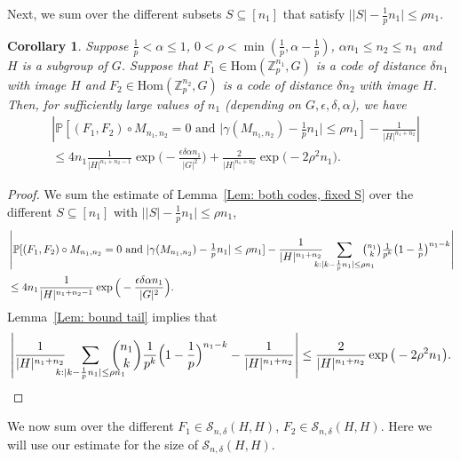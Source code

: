 \documentclass[12pt]{amsart}
\newtheorem{corollary}{Corollary}[theorem]
\theoremstyle{definition}
\newcommand{\PPP}{\mathbb{P}}
\newcommand{\SSS}[3]{\mathcal{S}_{#1}(#2,#3)}
\newcommand{\Mnot}{M_{n_1,n_2}}
\newcommand{\abs}[1]{\vert#1\vert}
\newcommand{\Zp}{\Z_p}
\newcommand{\Z}{\mathbb{Z}}
\newcommand{\Hom}{\text{Hom}}
\begin{document}
Next, we sum over the different subsets $S\subseteq[n_1]$ that satisfy $\abs{\abs{S}-\frac{1}{p}n_1}\leq \rho n_1$.

\begin{corollary}\label{Cor: both codes probability}
Suppose $\frac{1}{p}<\alpha\leq 1$, $0<\rho<\min(\frac{1}{p},\alpha-\frac{1}{p})$, $\alpha n_1\leq n_2\leq n_1$ and $H$ is a subgroup of $G$.
Suppose that $F_1\in\Hom(\Zp^{n_1},G)$ is a code of distance $\delta n_1$ with image $H$ and $F_2\in\Hom(\Zp^{n_2},G)$ is a code of distance $\delta n_2$ with image $H$.
Then, for sufficiently large values of $n_1$ (depending on $G,\epsilon,\delta,\alpha$), we have
\begin{align*}
&\left|
\PPP[(F_1,F_2)\circ \Mnot=0 \text{ and }
\abs{\gamma(\Mnot)- \tfrac{1}{p} n_1}\leq \rho n_1] 
- \frac{1}{\abs{H}^{n_1+n_2}}
\right|\\
&\leq 4n_1\frac{1}{\abs{H}^{n_1+n_2-1}} \exp\Big(-\frac{\epsilon\delta \alpha n_1}{|G|^2}\Big)
+ \frac{2}{\abs{H}^{n_1+n_2}} \exp\big(-2\rho^2 n_1\big).
\end{align*}
\end{corollary}
\begin{proof}
We sum the estimate of Lemma~\ref{Lem: both codes, fixed S} over the different $S\subseteq[n_1]$ with $\abs{\abs{S} - \frac{1}{p}n_1} \leq \rho n_1$,
\begin{align*}
&\left|
\PPP[(F_1,F_2)\circ \Mnot=0 \text{ and }
\abs{\gamma(\Mnot) -\tfrac{1}{p}n_1}\leq \rho n_1] 
- \frac{1}{\abs{H}^{n_1+n_2}}\!\!\!\!\!\!
\sum_{k:\abs{k-\frac{1}{p}n_1}\leq \rho n_1} \!\!\!\!\!\!\!\!
\tbinom{n_1}{k} \tfrac{1}{p^{k}} \big(1-\tfrac{1}{p}\big)^{n_1-k}
\right|\\
&\leq 4n_1\frac{1}{\abs{H}^{n_1+n_2-1}} \exp\Big(-\frac{\epsilon\delta \alpha n_1}{|G|^2}\Big).
\end{align*}
Lemma~\ref{Lem: bound tail} implies that
\[
\left|
\frac{1}{\abs{H}^{n_1+n_2}}\!\!\!\!\!\!
\sum_{k:\abs{k-\frac{1}{p}n_1}\leq \rho n_1} \!\!\!\!\!\!\!\!
\binom{n_1}{k} \frac{1}{p^{k}} \Big(1-\frac{1}{p}\Big)^{n_1-k}
-\frac{1}{\abs{H}^{n_1+n_2}}
\right|
\leq \frac{2}{\abs{H}^{n_1+n_2}} \exp\big(-2\rho^2 n_1\big).\qedhere
\]
\end{proof}

We now sum over the different $F_1\in \SSS{n,\delta}{H}{H}$, $F_2\in \SSS{n,\delta}{H}{H}$. Here we will use our estimate for the size of $\SSS{n,\delta}{H}{H}$.
\end{document}
